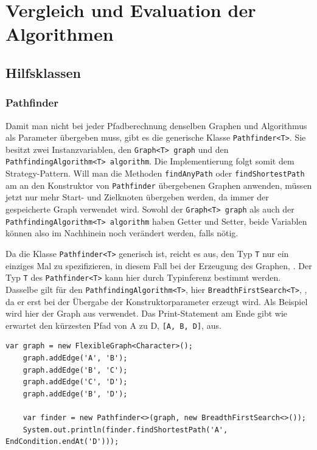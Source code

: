     \section{Vergleich und Evaluation der Algorithmen}

        \subsection{Hilfsklassen}

            \subsubsection{Pathfinder}

                Damit man nicht bei jeder Pfadberechnung denselben Graphen und Algorithmus als Parameter übergeben muss, gibt es die generische Klasse \lstinline{Pathfinder<T>}. Sie besitzt zwei Instanzvariablen, den \lstinline{Graph<T> graph} und den \lstinline{PathfindingAlgorithm<T> algorithm}. Die Implementierung folgt somit dem Strategy-Pattern. Will man die Methoden \lstinline{findAnyPath} oder \lstinline{findShortestPath} am an den Konstruktor von \lstinline{Pathfinder} übergebenen Graphen anwenden, müssen jetzt nur mehr Start- und Zielknoten übergeben werden, da immer der gespeicherte Graph verwendet wird. Sowohl der \lstinline{Graph<T> graph} als auch der \lstinline{PathfindingAlgorithm<T> algorithm} haben Getter und Setter, beide Variablen können also im Nachhinein noch verändert werden, falls nötig.
        
                
        
                Da die Klasse \lstinline{Pathfinder<T>} generisch ist, reicht es aus, den Typ \lstinline{T} nur ein einziges Mal zu spezifizieren, in diesem Fall bei der Erzeugung des Graphen, . Der Typ \lstinline{T} des \lstinline{Pathfinder<T>} kann hier durch Typinferenz bestimmt werden. Dasselbe gilt für den \lstinline{PathfindingAlgorithm<T>}, hier \lstinline{BreadthFirstSearch<T>}, , da er erst bei der Übergabe der Konstruktorparameter erzeugt wird. Als Beispiel wird hier der Graph aus  verwendet. Das Print-Statement am Ende gibt wie erwartet den kürzesten Pfad von A zu D, \lstinline{[A, B, D]}, aus.
        
                \begin{lstlisting}[caption=Typinferenz, label=lst:type-inference]
    var graph = new FlexibleGraph<Character>();
    graph.addEdge('A', 'B');
    graph.addEdge('B', 'C');
    graph.addEdge('C', 'D');
    graph.addEdge('B', 'D');
    
    var finder = new Pathfinder<>(graph, new BreadthFirstSearch<>());
    System.out.println(finder.findShortestPath('A', EndCondition.endAt('D')));
                \end{lstlisting}
        
